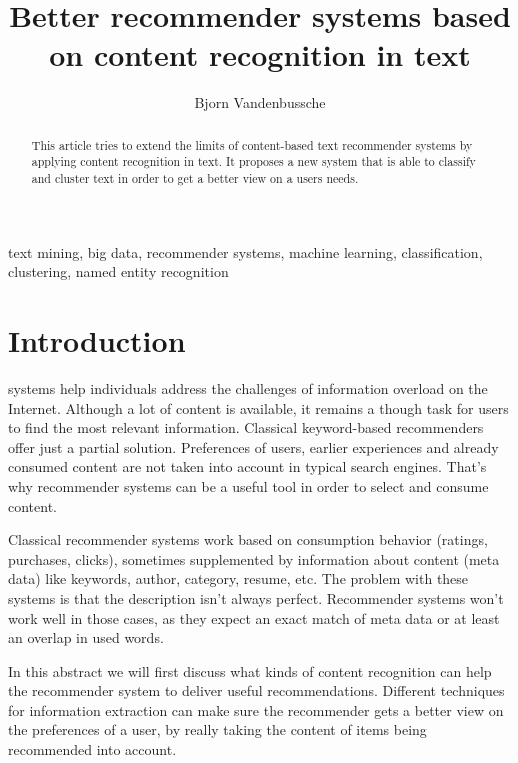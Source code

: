 \documentclass[twocolumn,twoside,a4paper]{phdsymp} %
\begin{document}
\title{Better recommender systems based on content recognition in text} %

\author{Bjorn Vandenbussche}


\maketitle

\begin{abstract}
This article tries to extend the limits of content-based text recommender systems by applying content recognition in text. It proposes a new system that is able to classify and cluster text in order to get a better view on a users needs. 
\end{abstract}

\begin{keywords}
text mining, big data, recommender systems, machine learning, classification, clustering, named entity recognition

\end{keywords}

\section{Introduction}
 systems help individuals address the challenges of information overload on the Internet. Although a lot of content is available, it remains a though task for users to find the most relevant information.
Classical keyword-based recommenders offer just a partial solution. Preferences of users, earlier experiences and already consumed content are not taken into account in typical search engines. That's why recommender systems can be a useful tool in order to select and consume content.  

Classical recommender systems work based on consumption behavior (ratings, purchases, clicks), sometimes supplemented by information about content (meta data) like keywords, author, category, resume, etc. The problem with these systems is that the description isn't always perfect. Recommender systems won't work well in those cases, as they expect an exact match of meta data or at least an overlap in used words.

In this abstract we will first discuss what kinds of content recognition can help the recommender system to deliver useful recommendations. Different techniques for information extraction can make sure the recommender gets a better view on the preferences of a user, by really taking the content of items being recommended into account. 
\end{document}
